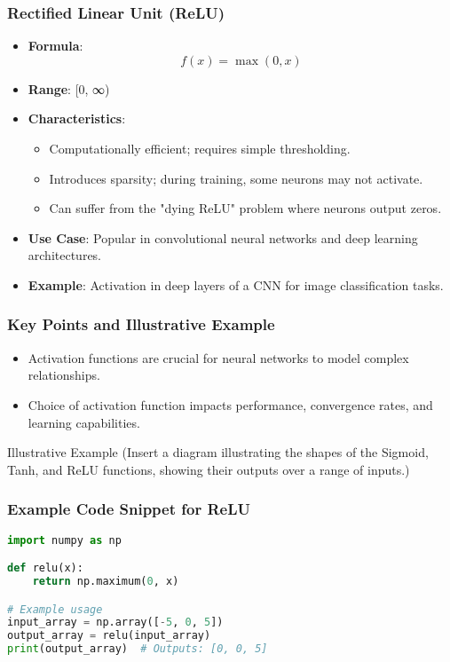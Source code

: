 \documentclass[aspectratio=169]{beamer}
\begin{document}
\begin{frame}[fragile]
    \frametitle{Rectified Linear Unit (ReLU)}
    \begin{itemize}
        \item \textbf{Formula}: 
        \begin{equation}
        f(x) = \max(0, x)
        \end{equation}
        \item \textbf{Range}: [0, ∞)
        \item \textbf{Characteristics}:
        \begin{itemize}
            \item Computationally efficient; requires simple thresholding.
            \item Introduces sparsity; during training, some neurons may not activate.
            \item Can suffer from the "dying ReLU" problem where neurons output zeros.
        \end{itemize}
        \item \textbf{Use Case}: Popular in convolutional neural networks and deep learning architectures.
        \item \textbf{Example}: Activation in deep layers of a CNN for image classification tasks.
    \end{itemize}
\end{frame}

\begin{frame}
    \frametitle{Key Points and Illustrative Example}
    \begin{itemize}
        \item Activation functions are crucial for neural networks to model complex relationships.
        \item Choice of activation function impacts performance, convergence rates, and learning capabilities.
    \end{itemize}
    \begin{block}{Illustrative Example}
        (Insert a diagram illustrating the shapes of the Sigmoid, Tanh, and ReLU functions, showing their outputs over a range of inputs.)
    \end{block}
\end{frame}

\begin{frame}[fragile]
    \frametitle{Example Code Snippet for ReLU}
    \begin{lstlisting}[language=Python]
import numpy as np

def relu(x):
    return np.maximum(0, x)

# Example usage
input_array = np.array([-5, 0, 5])
output_array = relu(input_array)
print(output_array)  # Outputs: [0, 0, 5]
    \end{lstlisting}
\end{frame}
\end{document}
